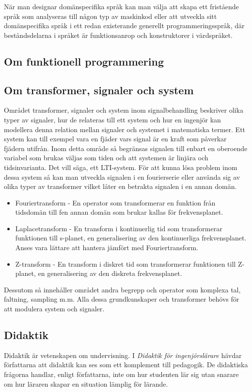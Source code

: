 \documentclass[]{article}
\begin{document}
När man designar domänspecifika språk kan man välja att skapa ett fristående
språk som analyseras till någon typ av maskinkod eller att utveckla sitt
domänspecifika språk i ett redan existerande generellt programmeringsspråk,
där beståndsdelarna i språket är funktionsanrop och konstruktorer i värdspråket.

\subsection{Om funktionell programmering}

\subsection{Om transformer, signaler och system}
Området transformer, signaler och system inom signalbehandling beskriver olika typer av signaler, hur de relateras till ett system och hur en ingenjör kan modellera denna relation mellan signaler och systemet i matematiska termer. Ett system kan till exempel vara en fjäder vars signal är en kraft som påverkar fjädern utifrån. Inom detta område så begränsas signalen till enbart en oberoende variabel som brukas väljas som tiden och att systemen är linjära och tidsinvarianta. Det vill säga, ett LTI-system.
För att kunna lösa problem inom dessa system så kan man utveckla signalen i en fourierserie eller använda sig av olika typer av transformer vilket låter en betrakta signalen i en annan domän. 
\begin{itemize}
\item Fouriertransform - En operator som transformerar en funktion från tidsdomän till fen annan domän som brukar kallas för frekvensplanet. 
\item Laplacetransform - En transform i kontinuerlig tid som transformerar funktionen till s-planet, en generalisering av den kontinuerliga frekvensplanet. Anses vara lättare att hantera jämfört med Fouriertransform.  
\item Z-transform - En transform i diskret tid som transformerar funktionen till Z-planet, en generalisering av den diskreta frekvensplanet.
\end{itemize}
Dessutom så innehåller området andra begrepp och operator som komplexa tal, faltning, sampling m.m. Alla dessa grundkunskaper och transformer behövs för att modulera system och signaler.


\subsection{Didaktik}
Didaktik är vetenskapen om undervisning.
I \textit{Didaktik för ingenjörslärare} hävdar författarna att
didaktik kan ses som ett komplement till pedagogik.
De didaktiska frågorna handlar, enligt författarna,
inte om hur studenten lär sig utan snarare om hur läraren skapar en
situation lämplig för lärande.
\end{document}
